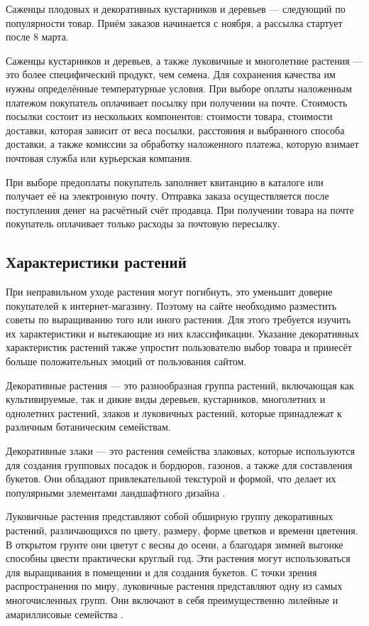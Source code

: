 Саженцы плодовых и декоративных кустарников и деревьев — следующий по популярности товар. Приём заказов начинается с ноября, а рассылка стартует после 8 марта.

Саженцы кустарников и деревьев, а также луковичные и многолетние растения — это более специфический продукт, чем семена. Для сохранения качества им нужны определённые температурные условия.
При выборе оплаты наложенным платежом покупатель оплачивает посылку при получении на почте. Стоимость посылки состоит из нескольких компонентов: стоимости товара, стоимости доставки, которая зависит от веса посылки, расстояния и выбранного способа доставки, а также комиссии за обработку наложенного платежа, которую взимает почтовая служба или курьерская компания.

При выборе предоплаты покупатель заполняет квитанцию в каталоге или получает её на электронную почту. Отправка заказа осуществляется после поступления денег на расчётный счёт продавца. При получении товара на почте покупатель оплачивает только расходы за почтовую пересылку.


\subsection{Характеристики растений}

При неправильном уходе растения могут погибнуть, это уменьшит доверие покупателей к интернет-магазину. Поэтому на сайте необходимо разместить советы по выращиванию того или иного растения. Для этого требуется изучить их характеристики и вытекающие из них классификации. Указание декоративных характеристик растений также упростит пользователю выбор товара и принесёт больше положительных эмоций от пользования сайтом.

Декоративные растения — это разнообразная группа растений, включающая как культивируемые, так и дикие виды деревьев, кустарников, многолетних и однолетних растений, злаков и луковичных растений, которые принадлежат к различным ботаническим семействам. 

Декоративные злаки — это растения семейства злаковых, которые используются для создания групповых посадок и бордюров, газонов, а также для составления букетов. Они обладают привлекательной текстурой и формой, что делает их популярными элементами ландшафтного дизайна \cite{kingsberry}.

Луковичные растения представляют собой обширную группу декоративных растений, различающихся по цвету, размеру, форме цветков и времени цветения. В открытом грунте они цветут с весны до осени, а благодаря зимней выгонке способны цвести практически круглый год. Эти растения могут использоваться для выращивания в помещении и для создания букетов. С точки зрения распространения по миру, луковичные растения представляют одну из самых многочисленных групп. Они включают в себя преимущественно лилейные и амариллисовые семейства \cite{belyaevskaya}.


